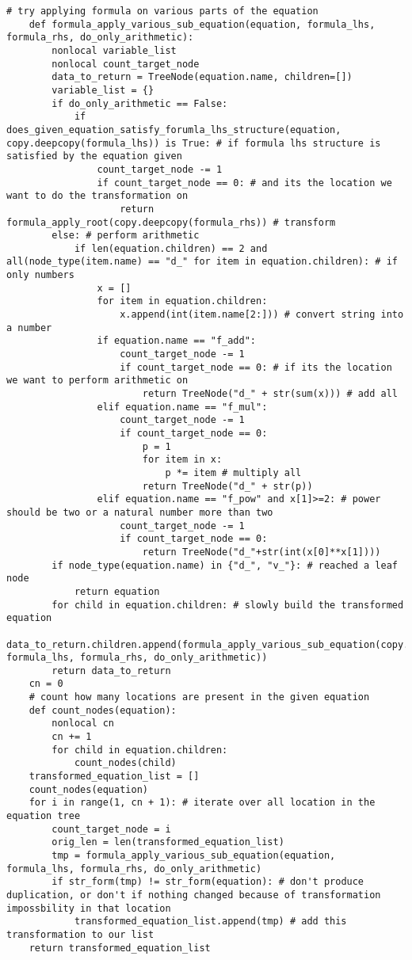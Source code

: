 \documentclass{book}
\begin{document}
\begin{lstlisting}[style=mystyle, caption={main.py}, label={lst:python_code}]
    # try applying formula on various parts of the equation
    def formula_apply_various_sub_equation(equation, formula_lhs, formula_rhs, do_only_arithmetic):
        nonlocal variable_list
        nonlocal count_target_node
        data_to_return = TreeNode(equation.name, children=[])
        variable_list = {}
        if do_only_arithmetic == False:
            if does_given_equation_satisfy_forumla_lhs_structure(equation, copy.deepcopy(formula_lhs)) is True: # if formula lhs structure is satisfied by the equation given
                count_target_node -= 1
                if count_target_node == 0: # and its the location we want to do the transformation on
                    return formula_apply_root(copy.deepcopy(formula_rhs)) # transform
        else: # perform arithmetic
            if len(equation.children) == 2 and all(node_type(item.name) == "d_" for item in equation.children): # if only numbers
                x = []
                for item in equation.children:
                    x.append(int(item.name[2:])) # convert string into a number
                if equation.name == "f_add":
                    count_target_node -= 1
                    if count_target_node == 0: # if its the location we want to perform arithmetic on
                        return TreeNode("d_" + str(sum(x))) # add all
                elif equation.name == "f_mul":
                    count_target_node -= 1
                    if count_target_node == 0:
                        p = 1
                        for item in x:
                            p *= item # multiply all
                        return TreeNode("d_" + str(p))
                elif equation.name == "f_pow" and x[1]>=2: # power should be two or a natural number more than two
                    count_target_node -= 1
                    if count_target_node == 0:
                        return TreeNode("d_"+str(int(x[0]**x[1])))
        if node_type(equation.name) in {"d_", "v_"}: # reached a leaf node
            return equation
        for child in equation.children: # slowly build the transformed equation
            data_to_return.children.append(formula_apply_various_sub_equation(copy.deepcopy(child), formula_lhs, formula_rhs, do_only_arithmetic))
        return data_to_return
    cn = 0
    # count how many locations are present in the given equation
    def count_nodes(equation):
        nonlocal cn
        cn += 1
        for child in equation.children:
            count_nodes(child)
    transformed_equation_list = []
    count_nodes(equation)
    for i in range(1, cn + 1): # iterate over all location in the equation tree
        count_target_node = i
        orig_len = len(transformed_equation_list)
        tmp = formula_apply_various_sub_equation(equation, formula_lhs, formula_rhs, do_only_arithmetic)
        if str_form(tmp) != str_form(equation): # don't produce duplication, or don't if nothing changed because of transformation impossbility in that location
            transformed_equation_list.append(tmp) # add this transformation to our list
    return transformed_equation_list 


\end{lstlisting}
\end{document}
